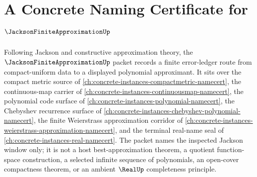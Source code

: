 \chapter{A Concrete Naming Certificate for $\JacksonFiniteApproximationUp$}
\label{ch:concrete-instances-jackson-finite-approximation-namecert}

Following Jackson and constructive approximation theory, the $\JacksonFiniteApproximationUp$ packet records a finite error-ledger route from compact-uniform data to a displayed polynomial approximant. It sits over the compact metric source of \autoref{ch:concrete-instances-compactmetric-namecert}, the continuous-map carrier of \autoref{ch:concrete-instances-continuousmap-namecert}, the polynomial code surface of \autoref{ch:concrete-instances-polynomial-namecert}, the Chebyshev recurrence surface of \autoref{ch:concrete-instances-chebyshev-polynomial-namecert}, the finite Weierstrass approximation corridor of \autoref{ch:concrete-instances-weierstrass-approximation-namecert}, and the terminal real-name seal of \autoref{ch:concrete-instances-real-namecert}. The packet names the inspected Jackson window only; it is not a host best-approximation theorem, a quotient function-space construction, a selected infinite sequence of polynomials, an open-cover compactness theorem, or an ambient $\RealUp$ completeness principle.

